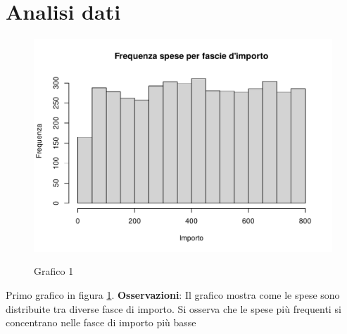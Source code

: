\section{Analisi dati}
\label{analisiDati}

\begin{figure}[t]
	\caption{Grafico 1}
	\includegraphics[page=1,width=\textwidth]{../R/grafici.pdf}
	\label{fig1}
\end{figure}

Primo grafico in figura \ref{fig1}. \textbf{Osservazioni}: Il grafico mostra come le spese sono distribuite tra diverse fasce di importo. Si osserva che le spese più frequenti si concentrano nelle fasce di importo più basse

\clearpage

